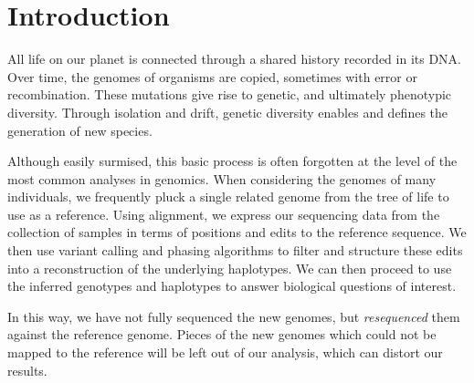 \documentclass[a4paper,12pt,numbered,oneside]{Classes/PhDThesisPSnPDF}
\begin{document}

\printnomenclature

\mainmatter

%

\chapter{Introduction}

\ifpdf
    \graphicspath{{Chapter1/Figs/Raster/}{Chapter1/Figs/PDF/}{Chapter1/Figs/}}
\else
    \graphicspath{{Chapter1/Figs/Vector/}{Chapter1/Figs/}}
\fi


All life on our planet is connected through a shared history recorded in its DNA.
Over time, the genomes of organisms are copied, sometimes with error or recombination.
These mutations give rise to genetic, and ultimately phenotypic diversity.
Through isolation and drift, genetic diversity enables and defines the generation of new species.

Although easily surmised, this basic process is often forgotten at the level of the most common analyses in genomics.
When considering the genomes of many individuals, we frequently pluck a single related genome from the tree of life to use as a reference.
Using alignment, we express our sequencing data from the collection of samples in terms of positions and edits to the reference sequence.
We then use variant calling and phasing algorithms to filter and structure these edits into a reconstruction of the underlying haplotypes.
We can then proceed to use the inferred genotypes and haplotypes to answer biological questions of interest.

In this way, we have not fully sequenced the new genomes, but \emph{resequenced} them against the reference genome.
Pieces of the new genomes which could not be mapped to the reference will be left out of our analysis, which can distort our results.
\end{document}
